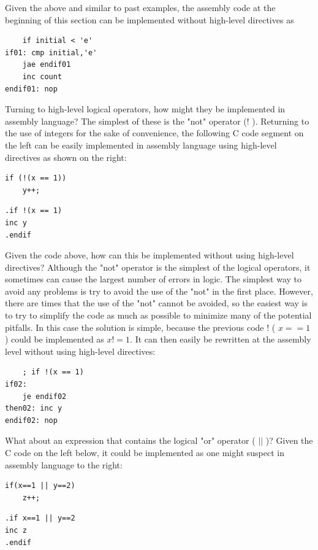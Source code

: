 \documentclass[10pt]{book}
\begin{document}
Given the above and similar to past examples, the assembly code at the beginning of this section can be implemented without high-level directives as

\begin{verbatim}
    if initial < 'e'
if01: cmp initial,'e'
    jae endif01
    inc count
endif01: nop
\end{verbatim}

Turning to high-level logical operators, how might they be implemented in assembly language? The simplest of these is the "not" operator (! ). Returning to the use of integers for the sake of convenience, the following C code segment on\\
the left can be easily implemented in assembly language using high-level directives as shown on the right:

\begin{verbatim}
if (!(x == 1))
    y++;
\end{verbatim}

\begin{verbatim}
.if !(x == 1)
inc y
.endif
\end{verbatim}

Given the code above, how can this be implemented without using high-level directives? Although the "not" operator is the simplest of the logical operators, it sometimes can cause the largest number of errors in logic. The simplest way to avoid any problems is try to avoid the use of the "not" in the first place. However, there are times that the use of the "not" cannot be avoided, so the easiest way is to try to simplify the code as much as possible to minimize many of the potential pitfalls. In this case the solution is simple, because the previous code ! ( $x==1$ ) could be implemented as $x!=1$. It can then easily be rewritten at the assembly level without using high-level directives:

\begin{verbatim}
    ; if !(x == 1)
if02:
    je endif02
then02: inc y
endif02: nop
\end{verbatim}

What about an expression that contains the logical "or" operator ( $|\mid$ )? Given the C code on the left below, it could be implemented as one might suspect in assembly language to the right:

\begin{verbatim}
if(x==1 || y==2)
    z++;
\end{verbatim}

\begin{verbatim}
.if x==1 || y==2
inc z
.endif
\end{verbatim}
\end{document}
